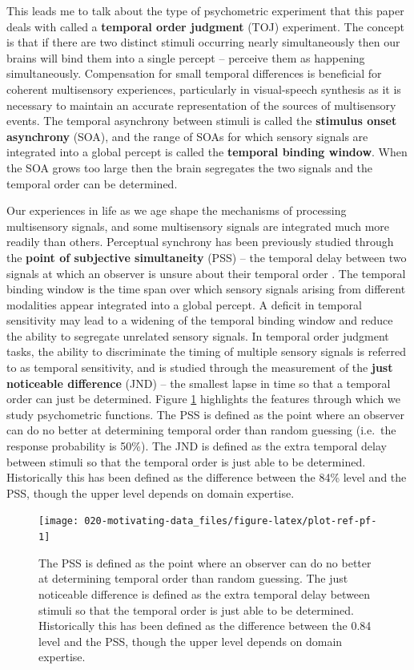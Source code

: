\documentclass[11pt, oneside]{book}
\begin{document}
This leads me to talk about the type of psychometric experiment that this paper deals with called a \textbf{temporal order judgment} (TOJ) experiment. The concept is that if there are two distinct stimuli occurring nearly simultaneously then our brains will bind them into a single percept -- perceive them as happening simultaneously. Compensation for small temporal differences is beneficial for coherent multisensory experiences, particularly in visual-speech synthesis as it is necessary to maintain an accurate representation of the sources of multisensory events. The temporal asynchrony between stimuli is called the \textbf{stimulus onset asynchrony} (SOA), and the range of SOAs for which sensory signals are integrated into a global percept is called the \textbf{temporal binding window}. When the SOA grows too large then the brain segregates the two signals and the temporal order can be determined.

Our experiences in life as we age shape the mechanisms of processing multisensory signals, and some multisensory signals are integrated much more readily than others. Perceptual synchrony has been previously studied through the \textbf{point of subjective simultaneity} (PSS) -- the temporal delay between two signals at which an observer is unsure about their temporal order \citep{stone2001now}. The temporal binding window is the time span over which sensory signals arising from different modalities appear integrated into a global percept. A deficit in temporal sensitivity may lead to a widening of the temporal binding window and reduce the ability to segregate unrelated sensory signals. In temporal order judgment tasks, the ability to discriminate the timing of multiple sensory signals is referred to as temporal sensitivity, and is studied through the measurement of the \textbf{just noticeable difference} (JND) -- the smallest lapse in time so that a temporal order can just be determined. Figure \ref{fig:plot-ref-pf} highlights the features through which we study psychometric functions. The PSS is defined as the point where an observer can do no better at determining temporal order than random guessing (i.e.~the response probability is 50\%). The JND is defined as the extra temporal delay between stimuli so that the temporal order is just able to be determined. Historically this has been defined as the difference between the 84\% level and the PSS, though the upper level depends on domain expertise.

\begin{figure}

{\centering \texttt{[image: 020-motivating-data\_files/figure-latex/plot-ref-pf-1]} 

}

\caption{The PSS is defined as the point where an observer can do no better at determining temporal order than random guessing. The just noticeable difference is defined as the extra temporal delay between stimuli so that the temporal order is just able to be determined. Historically this has been defined as the difference between the 0.84 level and the PSS, though the upper level depends on domain expertise.}\label{fig:plot-ref-pf}
\end{figure}
\end{document}
